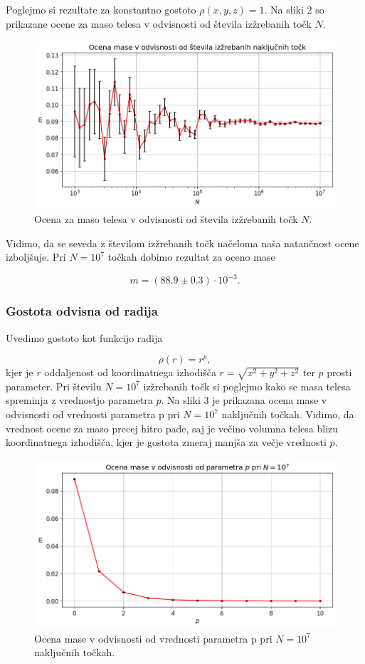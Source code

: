 \documentclass[slovene,11pt,a4paper]{article}
\begin{document}
Poglejmo si rezultate za konstantno gostoto $\rho(x,y,z)=1$. Na sliki 2 so prikazane ocene za maso telesa v odvisnosti od števila izžrebanih točk $N$.

\begin{figure}[h!]
\centering
\includegraphics[width=13cm]{telo2.png}
\caption{Ocena za maso telesa v odvisnosti od števila izžrebanih točk $N$.}
\end{figure}
Vidimo, da se seveda z številom izžrebanih točk načeloma naša natančnost ocene izboljšuje. Pri $N=10^7$ točkah dobimo rezultat za oceno mase

\[
m = (88.9 \pm 0.3) \cdot 10^{-3}.
\]


\subsubsection{Gostota odvisna od radija}

Uvedimo gostoto kot funkcijo radija

\begin{equation}
\rho(r) = r^p,
\end{equation}
kjer je $r$ oddaljenost od koordinatnega izhodišča $r = \sqrt{x^2+y^2+z^2}$ ter $p$ prosti parameter. Pri številu $N=10^7$ izžrebanih točk si poglejmo kako se masa telesa spreminja z vrednostjo parametra $p$. Na sliki 3 je prikazana ocena mase v odvisnosti od vrednosti parametra p pri $N=10^7$ naključnih točkah. Vidimo, da vrednost ocene za maso precej hitro pade, saj je večino volumna telesa blizu koordinatnega izhodišča, kjer je gostota zmeraj manjša za večje vrednosti $p$.

\begin{figure}[h!]
\centering
\includegraphics[width=13cm]{telo4.png}
\caption{Ocena mase v odvisnosti od vrednosti parametra p pri $N=10^7$ naključnih točkah.}
\end{figure}
\end{document}
